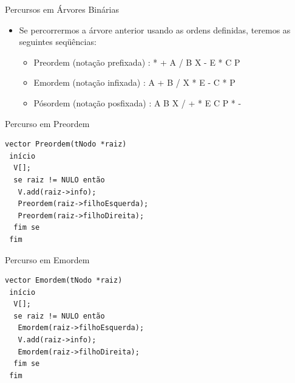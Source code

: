 \documentclass[12pt,table,xcolor={dvipsnames}]{beamer}
\begin{document}
\begin{frame}[fragile]{Percursos em Árvores Binárias}
          \begin{itemize}
          \item Se percorrermos a árvore anterior usando as ordens definidas, teremos as seguintes seqüências:
          \begin{itemize}
          \item Preordem (notação prefixada) : * + A	/ B X - E * C P
          \item Emordem (notação infixada) : A + B / X * E - C * P
          \item Pósordem (notação posfixada) : A B X / + * E C P * -
          \end{itemize}
       	  \end{itemize}
\end{frame}

\begin{frame}[fragile]{Percurso em Preordem}
          \begin{lstlisting}
vector Preordem(tNodo *raiz)
 início
  V[];
  se raiz != NULO então
   V.add(raiz->info);
   Preordem(raiz->filhoEsquerda); 		 		
   Preordem(raiz->filhoDireita);
  fim se
 fim
		  \end{lstlisting}
\end{frame} 

\begin{frame}[fragile]{Percurso em Emordem}
          \begin{lstlisting}
vector Emordem(tNodo *raiz)
 início
  V[];
  se raiz != NULO então
   Emordem(raiz->filhoEsquerda); 		 		
   V.add(raiz->info);
   Emordem(raiz->filhoDireita);
  fim se
 fim
		  \end{lstlisting}
\end{frame} 
\end{document}
